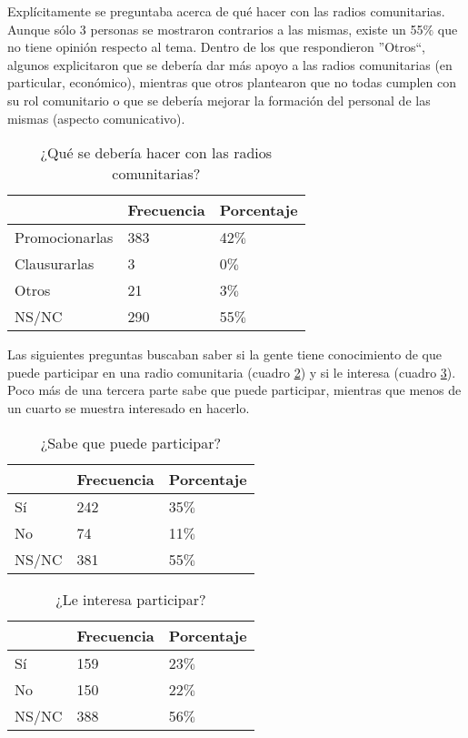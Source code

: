 \indent Explícitamente se preguntaba acerca de qué hacer con las radios comunitarias. Aunque sólo 3 personas se mostraron contrarios a las mismas, existe un 55$\%$ que no tiene opinión respecto al tema. Dentro de los que respondieron ''Otros``, algunos explicitaron que se debería dar más apoyo a las radios comunitarias (en particular, económico), mientras que otros plantearon que no todas cumplen con su rol comunitario o que se debería mejorar la formación del personal de las mismas (aspecto comunicativo).\\
\begin{table}[ht]
	\centering
{}
		\begin{tabular}{|l|l|l|}\hline
	\textbf{}&\textbf{Frecuencia}&\textbf{Porcentaje}\\\hline\hline
			Promocionarlas	&	383&	42$\%$\\\hline
			Clausurarlas	&	3&	0$\%$\\\hline
			Otros	&	21&	3$\%$\\\hline
			NS/NC	&	290&	55$\%$\\\hline
		\end{tabular}
	  \caption{¿Qué se debería hacer con las radios comunitarias?}
	  \label{QuoiFaireTabla}
\end{table}

\indent Las siguientes preguntas buscaban saber si la gente tiene conocimiento de que puede participar en una radio comunitaria (cuadro \ref{SabePuedeParticiparTabla}) y si le interesa (cuadro \ref{LinteresaParticiparTabla}). Poco más de una tercera parte sabe que puede participar, mientras que menos de un cuarto se muestra interesado en hacerlo.\\
\begin{table}[ht]
	\centering
{}
		\begin{tabular}{|l|l|l|}\hline
	\textbf{}&\textbf{Frecuencia}&\textbf{Porcentaje}\\\hline\hline
			Sí	&	242&	35$\%$\\\hline
			No	&	74&	11$\%$\\\hline
			NS/NC	&	381&	55$\%$\\\hline
		\end{tabular}
	  \caption{¿Sabe que puede participar?}
	  \label{SabePuedeParticiparTabla}
\end{table}

\begin{table}[ht]
	\centering
{}
		\begin{tabular}{|l|l|l|}\hline
	\textbf{}&\textbf{Frecuencia}&\textbf{Porcentaje}\\\hline\hline
			Sí	&	159&	23$\%$\\\hline
			No	&	150&	22$\%$\\\hline
			NS/NC	&	388&	56$\%$\\\hline
		\end{tabular}
	  \caption{¿Le interesa participar?}
	  \label{LinteresaParticiparTabla}
\end{table}

